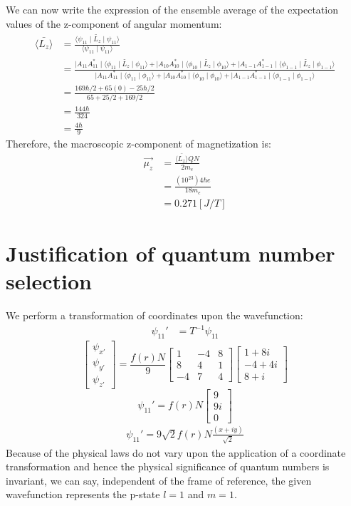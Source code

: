 \documentclass{article}
\numberwithin{equation}{section}
\begin{document}
We can now write the expression of the ensemble average of the expectation values of the z-component of angular momentum:
\begin{align*}
\bar{\langle L_z \rangle} &=\frac{\langle\psi_{11}\mid \tilde{L_z}\mid\psi_{11}\rangle}{\langle\psi_{11}\mid\psi_{11} \rangle}\\
		       &=\frac{\mid A_{11}A_{11}^* \mid\langle\phi_{11}\mid \tilde{L_z}\mid\phi_{11}\rangle+\mid A_{10}A_{10}^*\mid \langle\phi_{10}\mid \tilde{L_z}\mid\phi_{10}\rangle+\mid A_{1-1}A_{1-1}^*\mid\langle\phi_{1-1}\mid \tilde{L_z}\mid\phi_{1-1}\rangle}{\mid A_{11}A_{11}^*\mid\langle\phi_{11}\mid\phi_{11}\rangle+\mid A_{10}A_{10}^*\mid\langle\phi_{10}\mid\phi_{10}\rangle+\mid A_{1-1}A_{1-1}^*\mid \langle\phi_{1-1}\mid\phi_{1-1}\rangle}\\
                       &=\frac{169\hbar/2+65(0)-25\hbar/2}{65+25/2+169/2}\\
                       &=\frac{144\hbar}{324}\\
		       &=\frac{4\hbar}{9}
\end{align*}
Therefore, the macroscopic z-component of magnetization is:
\begin{align*}
\vec{\mu_z}&=\frac{\bar{\langle L_z \rangle} QN}{2m_e}\\
     &=\frac{(10^{23})4\hbar e}{18m_e}\\
     &=0.271 [J/T]
\end{align*}

\section*{Justification of quantum number selection}
We perform a transformation of coordinates upon the wavefunction:
\begin{align*}
 \psi_{11}'&=T^{-1}\psi_{11}
\end{align*}
\[
 \begin{bmatrix}
  \psi_{x'} \\
  \psi_{y'}  \\
  \psi_{z'}   
 \end{bmatrix}
  =\frac{f(r)N}{9}
 \begin{bmatrix}
  1 & -4 & 8\\
  8 & 4  & 1\\
 -4 & 7 & 4 
 \end{bmatrix}
 \begin{bmatrix}
  1+8i \\
  -4+4i \\
  8+i  
 \end{bmatrix}
\]
\[
\psi_{11}'=f(r)N
\begin{bmatrix}
  9 \\
  9i  \\
  0   
 \end{bmatrix}
\]
\begin{align*}
\psi_{11}'=9\sqrt{2}f(r)N\frac{(x+iy)}{\sqrt{2}}
\end{align*}
Because of the physical laws do not vary upon the application of a coordinate transformation and hence the physical significance of quantum numbers is invariant, we can say, independent of the frame of reference, the given wavefunction represents the p-state $l=1$ and $m=1$. 
\end{document}
